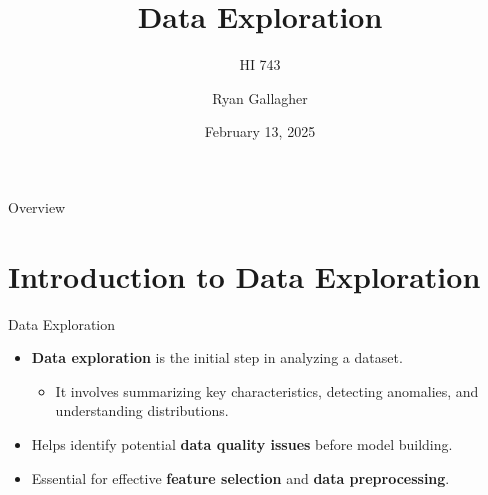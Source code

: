 \documentclass[aspectratio=169,xcolor=dvipsnames]{beamer}
\title{Data Exploration}
\subtitle{HI 743}
\author{Ryan Gallagher}
\institute
{
    Department of Health Informatics and Administration \\
    Zilber College of Public Health \\
    University of Wisconsin - Milwaukee%
}
\date{February 13, 2025} %
\begin{document}
\begin{frame}
    \titlepage
\end{frame}


\begin{frame}{Overview}
    \tableofcontents
\end{frame}


\section{Introduction to Data Exploration}
\begin{frame}{Data Exploration}
\begin{itemize}
	\setlength\itemsep{0.5cm}
	\item \textbf{Data exploration} is the initial step in analyzing a dataset.
	\begin{itemize}
		\item It involves summarizing key characteristics, detecting anomalies, and understanding distributions.
	\end{itemize}
	\item Helps identify potential \textbf{data quality issues} before model building.
	\item Essential for effective \textbf{feature selection} and \textbf{data preprocessing}.
\end{itemize}
\end{frame}
\end{document}
